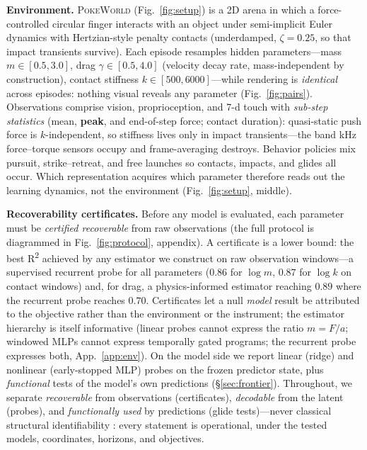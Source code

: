\documentclass{article} %
\newcommand{\pokeworld}{\textsc{PokeWorld}}
\begin{document}
\textbf{Environment.} \pokeworld{} (Fig.~\ref{fig:setup}) is a 2D arena in
which a force-controlled
circular finger interacts with an object under semi-implicit Euler dynamics with
Hertzian-style penalty contacts (underdamped, $\zeta{=}0.25$, so that impact
transients survive). Each episode resamples hidden parameters---mass
$m \in [0.5, 3.0]$, drag $\gamma \in [0.5, 4.0]$ (velocity decay rate,
mass-independent by construction), contact stiffness $k \in [500, 6000]$---while
rendering is \emph{identical} across episodes: nothing visual reveals any
parameter (Fig.~\ref{fig:pairs}). Observations comprise vision,
proprioception, and 7-d touch with
\emph{sub-step statistics} (mean, \textbf{peak}, and end-of-step force;
contact duration): quasi-static push force is $k$-independent, so stiffness
lives only in impact transients---the band kHz force--torque sensors occupy
and frame-averaging destroys. Behavior policies mix pursuit,
strike--retreat, and free launches so contacts, impacts, and glides all
occur. Which representation acquires which parameter therefore reads out
the learning dynamics, not the environment (Fig.~\ref{fig:setup}, middle).

\textbf{Recoverability certificates.} Before any model is evaluated, each
parameter must be \emph{certified recoverable} from raw observations
(the full protocol is diagrammed in Fig.~\ref{fig:protocol},
appendix). A certificate is a lower bound: the best R\textsuperscript{2} achieved by any
estimator we construct on raw observation windows---a supervised recurrent
probe for all parameters ($0.86$ for $\log m$, $0.87$ for $\log k$ on contact
windows) and, for drag, a physics-informed estimator reaching $0.89$ where
the recurrent probe reaches $0.70$. Certificates let a null \emph{model}
result be attributed to the objective rather than the environment or the
instrument; the estimator hierarchy is itself informative (linear probes
cannot express the ratio $m = F/a$; windowed MLPs cannot express temporally
gated programs; the recurrent probe expresses both, App.~\ref{app:env}). On
the model side we report linear (ridge) and nonlinear (early-stopped MLP)
probes on the frozen predictor state, plus \emph{functional} tests of the
model's own predictions (\S\ref{sec:frontier}). Throughout, we separate
\emph{recoverable} from observations (certificates), \emph{decodable} from
the latent (probes), and \emph{functionally used} by predictions (glide
tests)---never classical structural identifiability
\citep{ljung1999system}: every statement is operational, under the tested
models, coordinates, horizons, and objectives.
\end{document}
